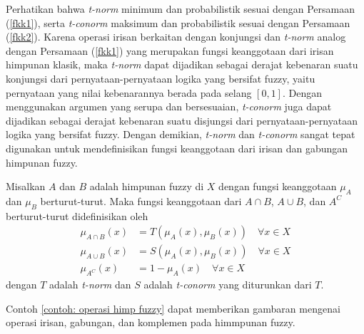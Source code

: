 \noindent Perhatikan bahwa \emph{t-norm} minimum dan probabilistik sesuai dengan Persamaan (\ref{fkk1}), serta \emph{t-conorm} maksimum dan probabilistik sesuai dengan Persamaan (\ref{fkk2}). Karena operasi irisan berkaitan dengan konjungsi dan \emph{t-norm} analog dengan Persamaan (\ref{fkk1}) yang merupakan fungsi keanggotaan dari irisan himpunan klasik, maka \emph{t-norm} dapat dijadikan sebagai derajat kebenaran suatu konjungsi dari pernyataan-pernyataan logika yang bersifat fuzzy, yaitu pernyataan yang nilai kebenarannya berada pada selang $[0,1]$. Dengan menggunakan argumen yang serupa dan bersesuaian, \emph{t-conorm} juga dapat dijadikan sebagai derajat kebenaran suatu disjungsi dari pernyataan-pernyataan logika yang bersifat fuzzy. Dengan demikian, \emph{t-norm} dan \emph{t-conorm} sangat tepat digunakan untuk mendefinisikan fungsi keanggotaan dari irisan dan gabungan himpunan fuzzy.
\begin{definition}\label{opfuzzy}
Misalkan $A$ dan $B$ adalah himpunan fuzzy di $X$ dengan fungsi keanggotaan $\mu_A$ dan $\mu_B$ berturut-turut. Maka fungsi keanggotaan dari $A \cap B$, $A \cup B$, dan $A^C$ berturut-turut didefinisikan oleh
\begin{align*}
    \mu_{A \cap B}(x) &= T\left(\mu_A(x),\mu_B(x)\right) \quad \forall x \in X\\
    \mu_{A \cup B}(x) &= S\left(\mu_A(x),\mu_B(x)\right) \quad \forall x \in X\\
    \mu_{A^C}(x) &= 1-\mu_A(x) \quad \forall x \in X
\end{align*}
dengan $T$ adalah \textit{t-norm} dan $S$ adalah \textit{t-conorm} yang diturunkan dari $T$.
\end{definition}

\noindent Contoh \ref{contoh: operasi himp fuzzy} dapat memberikan gambaran mengenai operasi irisan, gabungan, dan komplemen pada himmpunan fuzzy.

